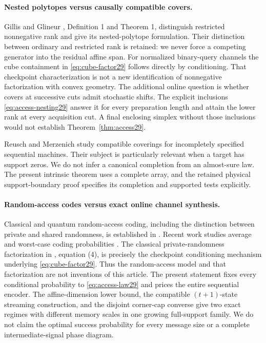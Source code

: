 \paragraph{Nested polytopes versus causally compatible covers.}
Gillis and Glineur \cite{GG}, Definition 1 and Theorem 1, distinguish
restricted nonnegative rank and give its nested-polytope formulation.
Their distinction between ordinary and restricted rank is retained:
we never force a competing generator into the residual affine span.
For normalized binary-query channels the cube containment in
\eqref{eq:cube-factor29} follows directly by conditioning. That
checkpoint characterization is not a new identification of
nonnegative factorization with convex geometry. The additional online
question is whether covers at successive cuts admit stochastic shifts.
The explicit inclusions \eqref{eq:access-nesting29} answer it for every
preparation length and attain the lower rank at every acquisition cut.
A final enclosing simplex without those inclusions would not establish
Theorem~\ref{thm:access29}.

Reusch and Merzenich \cite{Reusch} study compatible coverings for
incompletely specified sequential machines. Their subject is particularly
relevant when a target has support zeros. We do not infer a canonical
completion from an almost-sure law. The present intrinsic theorem uses
a complete array, and the retained physical support-boundary proof
specifies its completion and supported tests explicitly.

\paragraph{Random-access codes versus exact online channel synthesis.}
Classical and quantum random-access coding, including the distinction
between private and shared randomness, is established in
\cite{ALMO}. Recent work studies average and worst-case coding
probabilities \cite{RAC2026,Liu2026}. The classical private-randomness
factorization in \cite{Liu2026}, equation (4), is precisely the
checkpoint conditioning mechanism underlying \eqref{eq:cube-factor29}.
Thus the random-access model and that factorization are not inventions
of this article. The present statement fixes every conditional
probability to \eqref{eq:access-law29} and prices the entire sequential
encoder. The affine-dimension lower bound, the compatible $(t+1)$-state
streaming construction, and the disjoint corner-cap converse give two
exact regimes with different memory scales in one growing full-support
family. We do not claim the optimal success probability for every
message size or a complete intermediate-signal phase diagram.


